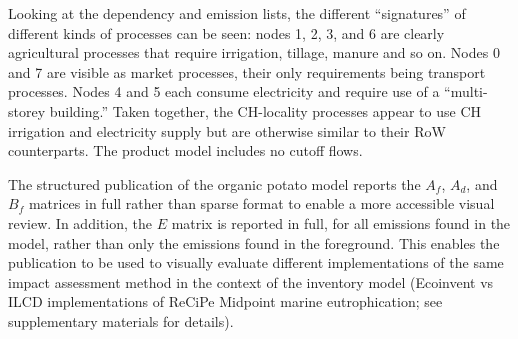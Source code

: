 Looking at the dependency and emission lists, the different ``signatures'' of different kinds of processes can be seen: nodes 1, 2, 3, and 6 are clearly agricultural processes that require irrigation, tillage, manure and so on.  Nodes 0 and 7 are visible as market processes, their only requirements being transport processes.  Nodes 4 and 5 each consume electricity and require use of a ``multi-storey building.''  Taken together, the CH-locality processes appear to use CH irrigation and electricity supply but are otherwise similar to their RoW counterparts.  The product model includes no cutoff flows.

The structured publication of the organic potato model reports the $A_f$, $A_d$, and $B_f$ matrices in full rather than sparse format to enable a more accessible visual review.  In addition, the $E$ matrix is reported in full, for all emissions found in the model, rather than only the emissions found in the foreground.  This enables the publication to be used to visually evaluate different implementations of the same impact assessment method in the context of the inventory model (Ecoinvent vs ILCD implementations of ReCiPe Midpoint marine eutrophication; see supplementary materials for details).

